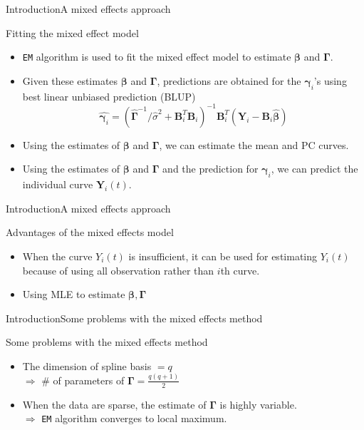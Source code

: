 \documentclass{beamer}
\def \bY {\mathbf{Y}}
\def \bB {\mathbf{B}}
\def \bbeta {\boldsymbol{\beta}}
\def \bgamma {\boldsymbol{\gamma}}
\def \bGamma {\boldsymbol{\Gamma}}
\begin{document}
\begin{frame}{Introduction}{A mixed effects approach}
	\begin{block}{Fitting the mixed effect model}
		\begin{itemize}
			\item {
				\texttt{EM} algorithm is used to fit the mixed effect model to estimate $\bbeta$ and $\bGamma$.
			}
			\item {
				Given these estimates $\bbeta$ and $\bGamma$, predictions are obtained  for the $\bgamma_i$'s using best linear unbiased prediction (BLUP)
				$$ \hat{\bgamma_i}= (\hat{\bGamma}^{-1}/\hat{\sigma}^2+\bB_i^T\bB_i)^{-1}\bB_i^T(\bY_i-\bB_i\hat{\bbeta}) $$
			}
			\item {
				Using the estimates of $\bbeta$ and $\bGamma$, we can estimate the mean and PC curves.
			}
			\item {
				Using the estimates of $\bbeta$ and $\bGamma$ and the prediction for $\bgamma_i$, we can predict the individual curve $\bY_i(t)$.
			}
		\end{itemize}
	\end{block}
	
\end{frame}

\begin{frame}{Introduction}{A mixed effects approach}
	\begin{block}{Advantages of the mixed effects model}
		\begin{itemize}
			\item {
				When the curve $Y_i(t)$ is insufficient, it can be used for estimating $Y_i(t)$ because of using all observation rather than $i$th curve.
			}
			\item {
				Using MLE to estimate $\bbeta, \bGamma$
			}
		\end{itemize}
	\end{block}
\end{frame}

\begin{frame}{Introduction}{Some problems with the mixed effects method}
	\begin{block}{Some problems with the mixed effects method}
		\begin{itemize}
			\item {
				The dimension of spline basis $=q$ \\
				$\Rightarrow$ \# of parameters of $\bGamma= \frac{q(q+1)}{2}$ 
			}
			\item {
				When the data are sparse, the estimate of $\bGamma$ is highly variable.\\
				$\Rightarrow$ \texttt{EM} algorithm converges to local maximum.
			}
		\end{itemize}
	\end{block}
\end{frame}
\end{document}
